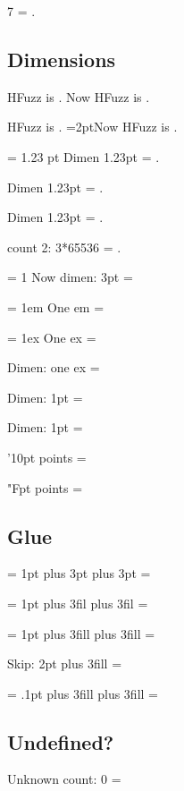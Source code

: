 \documentclass{article}
\begin{document}
7 = \the{}.

\subsection{Dimensions}
HFuzz is \the\hfuzz.
\hfuzz=2pt
Now HFuzz is \the\hfuzz.

HFuzz is \the\hfuzz.
\hfuzz=2ptNow HFuzz is \the\hfuzz.



= 1.23 pt\relax
Dimen 1.23pt = \the{}.

Dimen 1.23pt = \the\dimen\two.

Dimen 1.23pt = \the\dimen{}.

\relax\multiply{}\relax
count 2: 3*65536 = \the\two.

= 1\relax
Now dimen: 3pt = \the{}

 = 1em\relax
One em = \the{}

 = 1ex\relax
One ex = \the{}

\dimendef{}
Dimen: one ex = \the\dseven

\relax
Dimen: 1pt = \the\dseven

Dimen: 1pt = \the{}

\dseven'10pt points = \the{}

\dseven"Fpt points = \the{}

\subsection{Glue}
 = 1pt plus 3pt\relax
1pt plus 3pt = \the{}

 = 1pt plus 3fil\relax
1pt plus 3fil = \the{}

 = 1pt plus 3fill\relax
1pt plus 3fill = \the{}

\advance{}
Skip: 2pt plus 3fill = \the{}

 = .1pt plus 3fill plus 3fill = \the{}

\subsection{Undefined?}

Unknown count: 0 = \the{}\relax
\end{document}
